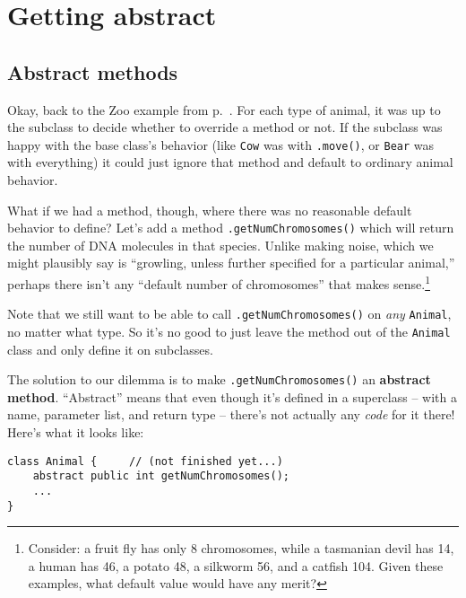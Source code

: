 \section{Getting abstract}

\subsection{Abstract methods}

Okay, back to the Zoo example from p.~\pageref{zooExample}. For each type of
animal, it was up to the subclass to decide whether to override a method or
not. If the subclass was happy with the base class's behavior (like
\texttt{Cow} was with \texttt{.move()}, or \texttt{Bear} was with everything)
it could just ignore that method and default to ordinary animal behavior.

What if we had a method, though, where there was no reasonable default
behavior to define? Let's add a method \texttt{.getNumChromosomes()} which
will return the number of DNA molecules in that species. Unlike making noise,
which we might plausibly say is ``growling, unless further specified for a
particular animal,'' perhaps there isn't any ``default number of chromosomes''
that makes sense.\footnote{Consider: a fruit fly has only 8 chromosomes, while
a tasmanian devil has 14, a human has 46, a potato 48, a silkworm 56, and a
catfish 104. Given these examples, what default value would have any merit?}

Note that we still want to be able to call \texttt{.getNumChromosomes()} on
\textit{any} \texttt{Animal}, no matter what type. So it's no good to just
leave the method out of the \texttt{Animal} class and only define it on
subclasses.

The solution to our dilemma is to make \texttt{.getNumChromosomes()} an
\textbf{abstract method}. ``Abstract'' means that even though it's defined in a
superclass -- with a name, parameter list, and return type -- there's not
actually any \textit{code} for it there! Here's what it looks like:

\begin{Verbatim}[fontsize=\small,samepage=true,frame=single]
class Animal {     // (not finished yet...)
    abstract public int getNumChromosomes();
    ...
}
\end{Verbatim}

